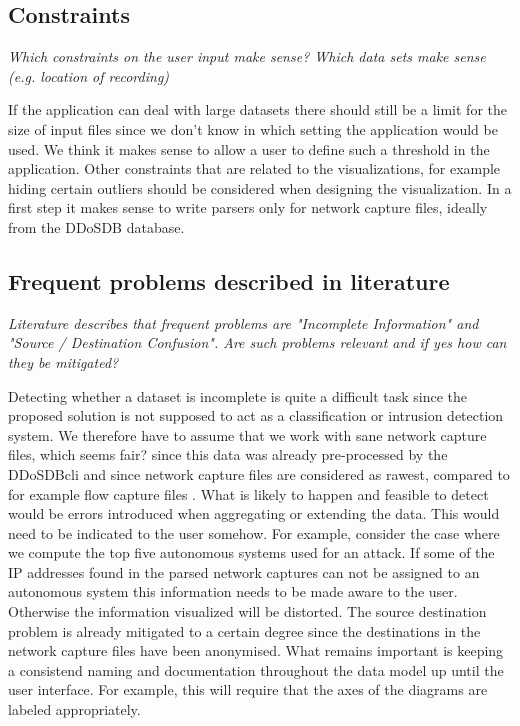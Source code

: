     \subsection{Constraints} 
\textit{Which constraints on the user input make sense? Which data sets make sense (e.g. location of recording)
}

If the application can deal with large datasets there should still be a limit for the size of input files since we don't know in which setting the application would be used. We think it makes sense to allow a user to define such a threshold in the application. Other constraints that are related to the visualizations, for example hiding certain outliers should be considered when designing the visualization.
In a first step it makes sense to write parsers only for network capture files, ideally from the DDoSDB database.
    
    \subsection{Frequent problems described in literature} 
    \textit{Literature describes that frequent problems are "Incomplete Information" and "Source / Destination Confusion". Are such problems relevant and if yes how can they be mitigated?}
    
    Detecting whether a dataset is incomplete is quite a difficult task since the proposed solution is not supposed to act as a classification or intrusion detection system. We therefore have to assume that we work with sane network capture files, which seems fair? since this data was already pre-processed by the DDoSDB\-cli and since network capture files are considered as rawest, compared to for example flow capture files \cite{appliedsecurityvisualization}.
    What is likely to happen and feasible to detect would be errors introduced when aggregating or extending the data. This would need to be indicated to the user somehow. For example, consider the case where we compute the top five autonomous systems used for an attack. If some of the IP addresses found in the parsed network captures can not be assigned to an autonomous system this information needs to be made aware to the user. Otherwise the information visualized will be distorted.
    The source destination problem is already mitigated to a certain degree since the destinations in the network capture files have been anonymised. What remains important is keeping a consistend naming and documentation throughout the data model up until the user interface. For example, this will require that the axes of the diagrams are labeled appropriately.
    
